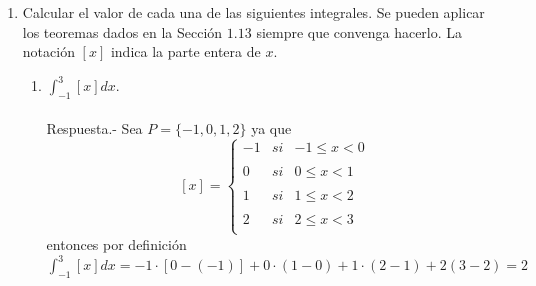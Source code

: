 \begin{enumerate}

    \item Calcular el valor de cada una de las siguientes integrales. Se pueden aplicar los teoremas dados en la Sección $1.13$ siempre que convenga hacerlo. La notación $[x]$ indica la parte entera de $x$.

    \begin{enumerate}[\bfseries (a)]
	
	\item $\displaystyle\int_{-1}^{3} [x] dx.$\\\\ 
	    Respuesta.-\; Sea $P=\lbrace -1,0,1,2 \rbrace$ ya que 
	    $$[x] = \left\{ \begin{array}{rcl}
		-1&si& -1\leq x <0\\
		\\ 0&si& 0\leq x < 1 \\
		\\ 1&si& 1\leq x < 2 \\
		\\ 2&si& 2\leq x < 3 \\
		\end{array}\right.$$
	    entonces por definición $\displaystyle\int_{-1}^{3} [x] dx = -1\cdot [0-(-1)] + 0\cdot (1-0) + 1\cdot (2-1) + 2(3-2) = 2$\\\\


\end{enumerate}
\end{enumerate}
